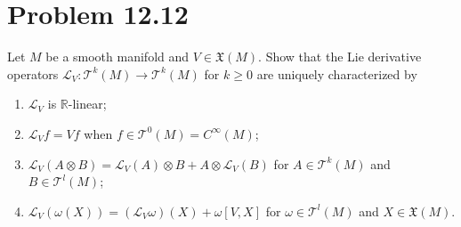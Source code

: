 \documentclass[11pt, letterpaper]{article}
\begin{document}
\section{Problem 12.12}
\begin{problem}\label{4}
	Let $M$ be a smooth manifold and $V\in \mathfrak{X} (M)$. Show that the Lie derivative operators $\mathcal{L} _V : \mathcal{T} ^k(M) \to \mathcal{T} ^k(M)$ for $k\geq 0$ are uniquely characterized by
	\begin{enumerate}
		\item $\mathcal{L} _V$ is $\mathbb{R} $-linear;
		\item $\mathcal{L} _Vf=Vf$ when $f\in \mathcal{T} ^0(M)=C^\infty (M)$;
		\item $\mathcal{L} _V(A\otimes B)=\mathcal{L} _V(A)\otimes B+A\otimes \mathcal{L} _V(B)$ for $A\in \mathcal{T} ^k(M)$ and $B\in \mathcal{T} ^l(M)$;
		\item $\mathcal{L} _V(\omega (X))=(\mathcal{L} _V\omega )(X)+\omega [V,X]$ for $\omega \in \mathcal{T} ^l(M)$ and $X\in \mathfrak{X} (M)$.
	\end{enumerate}
\end{problem}
\end{document}
